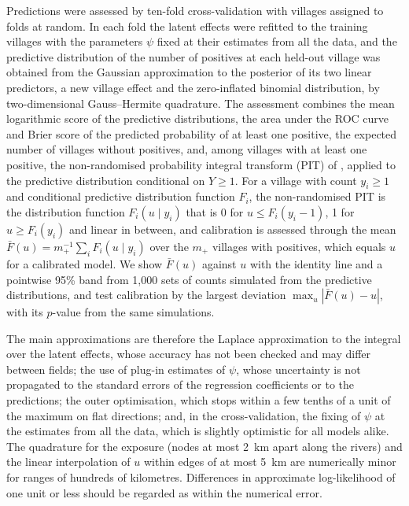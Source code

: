 \documentclass[11pt,a4paper]{article}
\begin{document}
Predictions were assessed by ten-fold cross-validation with villages assigned to folds at random. In each fold the latent effects were refitted to the training villages with the parameters $\psi$ fixed at their estimates from all the data, and the predictive distribution of the number of positives at each held-out village was obtained from the Gaussian approximation to the posterior of its two linear predictors, a new village effect and the zero-inflated binomial distribution, by two-dimensional Gauss--Hermite quadrature. The assessment combines the mean logarithmic score of the predictive distributions, the area under the ROC curve and Brier score of the predicted probability of at least one positive, the expected number of villages without positives, and, among villages with at least one positive, the non-randomised probability integral transform (PIT) of \citet{czado2009}, applied to the predictive distribution conditional on $Y \geq 1$. For a village with count $y_i \geq 1$ and conditional predictive distribution function $F_i$, the non-randomised PIT is the distribution function $F_i(u \mid y_i)$ that is 0 for $u \leq F_i(y_i - 1)$, 1 for $u \geq F_i(y_i)$ and linear in between, and calibration is assessed through the mean $\bar F(u) = m_+^{-1} \sum_i F_i(u \mid y_i)$ over the $m_+$ villages with positives, which equals $u$ for a calibrated model. We show $\bar F(u)$ against $u$ with the identity line and a pointwise 95\% band from 1{,}000 sets of counts simulated from the predictive distributions, and test calibration by the largest deviation $\max_u |\bar F(u) - u|$, with its $p$-value from the same simulations.

The main approximations are therefore the Laplace approximation to the integral over the latent effects, whose accuracy has not been checked and may differ between fields; the use of plug-in estimates of $\psi$, whose uncertainty is not propagated to the standard errors of the regression coefficients or to the predictions; the outer optimisation, which stops within a few tenths of a unit of the maximum on flat directions; and, in the cross-validation, the fixing of $\psi$ at the estimates from all the data, which is slightly optimistic for all models alike. The quadrature for the exposure (nodes at most 2~km apart along the rivers) and the linear interpolation of $u$ within edges of at most 5~km are numerically minor for ranges of hundreds of kilometres. Differences in approximate log-likelihood of one unit or less should be regarded as within the numerical error.
\end{document}
